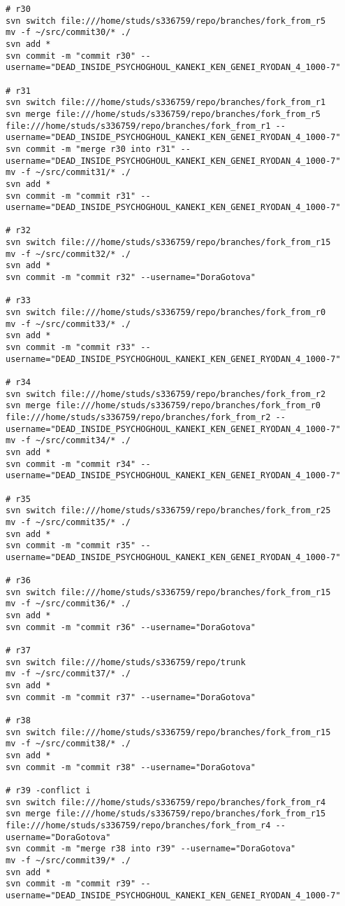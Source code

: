 \begin{verbatim}
# r30
svn switch file:///home/studs/s336759/repo/branches/fork_from_r5
mv -f ~/src/commit30/* ./
svn add *
svn commit -m "commit r30" --username="DEAD_INSIDE_PSYCHOGHOUL_KANEKI_KEN_GENEI_RYODAN_4_1000-7"

# r31
svn switch file:///home/studs/s336759/repo/branches/fork_from_r1
svn merge file:///home/studs/s336759/repo/branches/fork_from_r5 file:///home/studs/s336759/repo/branches/fork_from_r1 --username="DEAD_INSIDE_PSYCHOGHOUL_KANEKI_KEN_GENEI_RYODAN_4_1000-7"
svn commit -m "merge r30 into r31" --username="DEAD_INSIDE_PSYCHOGHOUL_KANEKI_KEN_GENEI_RYODAN_4_1000-7"
mv -f ~/src/commit31/* ./
svn add *
svn commit -m "commit r31" --username="DEAD_INSIDE_PSYCHOGHOUL_KANEKI_KEN_GENEI_RYODAN_4_1000-7"

# r32
svn switch file:///home/studs/s336759/repo/branches/fork_from_r15
mv -f ~/src/commit32/* ./
svn add *
svn commit -m "commit r32" --username="DoraGotova"

# r33
svn switch file:///home/studs/s336759/repo/branches/fork_from_r0
mv -f ~/src/commit33/* ./
svn add *
svn commit -m "commit r33" --username="DEAD_INSIDE_PSYCHOGHOUL_KANEKI_KEN_GENEI_RYODAN_4_1000-7"

# r34
svn switch file:///home/studs/s336759/repo/branches/fork_from_r2
svn merge file:///home/studs/s336759/repo/branches/fork_from_r0 file:///home/studs/s336759/repo/branches/fork_from_r2 --username="DEAD_INSIDE_PSYCHOGHOUL_KANEKI_KEN_GENEI_RYODAN_4_1000-7"
mv -f ~/src/commit34/* ./
svn add *
svn commit -m "commit r34" --username="DEAD_INSIDE_PSYCHOGHOUL_KANEKI_KEN_GENEI_RYODAN_4_1000-7"

# r35
svn switch file:///home/studs/s336759/repo/branches/fork_from_r25
mv -f ~/src/commit35/* ./
svn add *
svn commit -m "commit r35" --username="DEAD_INSIDE_PSYCHOGHOUL_KANEKI_KEN_GENEI_RYODAN_4_1000-7"

# r36
svn switch file:///home/studs/s336759/repo/branches/fork_from_r15
mv -f ~/src/commit36/* ./
svn add *
svn commit -m "commit r36" --username="DoraGotova"

# r37
svn switch file:///home/studs/s336759/repo/trunk
mv -f ~/src/commit37/* ./
svn add *
svn commit -m "commit r37" --username="DoraGotova"

# r38
svn switch file:///home/studs/s336759/repo/branches/fork_from_r15
mv -f ~/src/commit38/* ./
svn add *
svn commit -m "commit r38" --username="DoraGotova"

# r39 -conflict i
svn switch file:///home/studs/s336759/repo/branches/fork_from_r4
svn merge file:///home/studs/s336759/repo/branches/fork_from_r15 file:///home/studs/s336759/repo/branches/fork_from_r4 --username="DoraGotova"
svn commit -m "merge r38 into r39" --username="DoraGotova"
mv -f ~/src/commit39/* ./
svn add *
svn commit -m "commit r39" --username="DEAD_INSIDE_PSYCHOGHOUL_KANEKI_KEN_GENEI_RYODAN_4_1000-7"


\end{verbatim}
